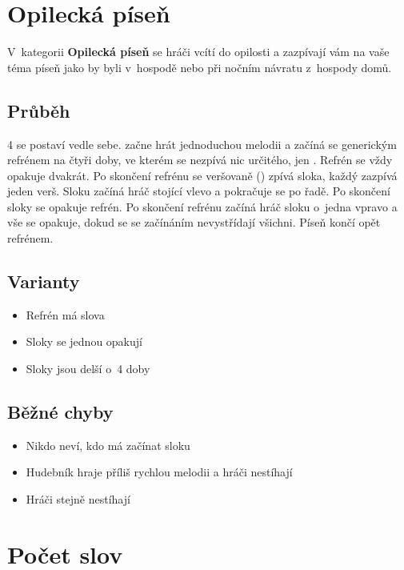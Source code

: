  
 
\needspace{5cm} \section{Opilecká píseň} \label{opilecká píseň}  
 
V~kategorii \textbf{Opilecká píseň} se hráči vcítí do opilosti a zazpívají vám na vaše téma píseň jako by byli v~hospodě nebo při nočním návratu z~hospody domů. 
 
 
\subsection{ Průběh } 4  se postaví vedle sebe.  začne hrát jednoduchou melodii a začíná se generickým refrénem na čtyři doby, ve kterém se nezpívá nic určitého, jen  . Refrén se vždy opakuje dvakrát. Po skončení refrénu se veršovaně () zpívá sloka, každý  zazpívá jeden verš. Sloku začíná hráč stojící vlevo a pokračuje se po řadě. Po skončení sloky se opakuje refrén. Po skončení refrénu začíná hráč sloku o~jedna vpravo a vše se opakuje, dokud se se začínáním nevystřídají všichni. Píseň končí opět refrénem. 
 
\subsection{ Varianty } \begin{itemize}
\item Refrén má slova
\item Sloky se jednou opakují
\item Sloky jsou delší o~4 doby
\end{itemize}
 
\subsection{ Běžné chyby } \begin{itemize}
\item Nikdo neví, kdo má začínat sloku
\item Hudebník hraje příliš rychlou melodii a hráči nestíhají
\item Hráči stejně nestíhají
\end{itemize}
 
 
 
 
 
 
\needspace{5cm} \section{Počet slov} \label{počet slov}  
 
